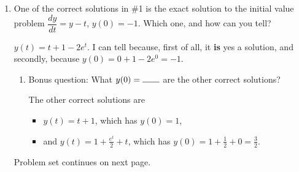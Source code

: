 \begin{enumerate}[leftmargin=0pt]
\begin{enumerate}
    \begin{red}
    The LHS of the differential equation is $\dfrac{dy}{dt}$, which in this case is $2e^t$. 
    
    The RHS of the differential equation is $y-t$, which in this case is $\left(2e^t\right)-t$. 
    
    So, this \textbf{is not a solution}, boo, because the LHS and the RHS \textbf{don't} match.
    \end{red}
    \item $y(t) = 1+\frac{e^t}{2}+t$
    
    \begin{red}
    The LHS of the differential equation is $\dfrac{dy}{dt}$, which in this case is $0 + \frac{e^t}{2}+1$. 
    
    The RHS of the differential equation is $y-t$, which in this case is $\left(1+\frac{e^t}{2}+t\right)-t = 1+\frac{e^t}{2}$. 
    
    So, this \textbf{is a solution}, yay, because the LHS and the RHS match.
    \end{red}
\end{enumerate}

\item One of the correct solutions in \#1 is the exact solution to the initial value problem $\dfrac{dy}{dt} = y-t$, $y(0) = -1$. Which one, and how can you tell?

\begin{red}
$y(t) = t + 1 - 2e^t$. I can tell because, first of all, it \textbf{is} yes a solution, and secondly, because $y(0) = 0 + 1 - 2e^0 = -1$.
\end{red}
\begin{enumerate}
    \item Bonus question: What $y(0) = \rule{0.7cm}{0.15mm}$ are the other correct solutions?

    \begin{red}
        The other correct solutions are 
        \begin{itemize}
            \item $y(t) = t + 1$, which has $y(0) = 1$,
            \item and $y(t) = 1+\frac{e^t}{2}+t$, which has $y(0) = 1 + \frac12 + 0 = \frac32$.
        \end{itemize}
    \end{red}
\end{enumerate}

Problem set continues on next page.


\end{enumerate}
